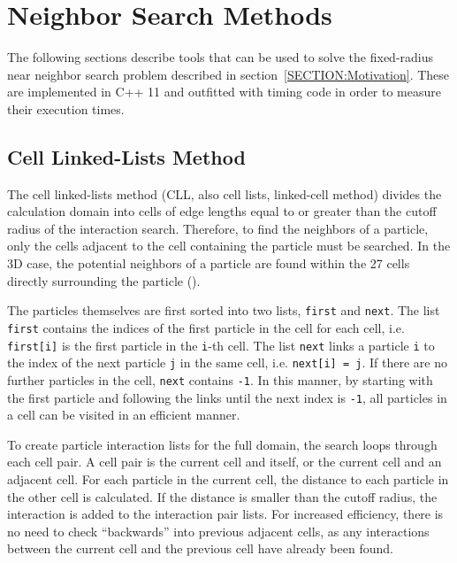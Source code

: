 \chapter{Neighbor Search Methods}

The following sections describe tools that can be used to solve the fixed-radius near neighbor search problem described in section~\ref{SECTION:Motivation}. These are implemented in C++ 11 and outfitted with timing code in order to measure their execution times. 

\section{Cell Linked-Lists Method}

The cell linked-lists method (CLL, also cell lists, linked-cell method) divides the calculation domain into cells of edge lengths equal to or greater than the cutoff radius of the interaction search. Therefore, to find the neighbors of a particle, only the cells adjacent to the cell containing the particle must be searched. In the 3D case, the potential neighbors of a particle are found within the 27 cells directly surrounding the particle (\cite{Weygand18}).

The particles themselves are first sorted into two lists, \texttt{first} and \texttt{next}. The list \texttt{first} contains the indices of the first particle in the cell for each cell, i.e. \texttt{first[i]} is the first particle in the  \texttt{i}-th cell.   The list \texttt{next} links a particle \texttt{i} to the index of the next particle \texttt{j} in the same cell, i.e. \texttt{next[i] = j}. If there are no further particles in the cell, \texttt{next} contains \texttt{-1}. In this manner, by starting with the first particle and following the links until the next index is \texttt{-1}, all particles in a cell can be visited in an efficient manner.

To create particle interaction lists for the full domain, the search loops through each cell pair. A cell pair is the current cell and itself, or the current cell and an adjacent cell. For each particle in the current cell, the distance to each particle in the other cell is calculated. If the distance is smaller than the cutoff radius, the interaction is added to the interaction pair lists. For increased efficiency, there is no need to check ``backwards'' into previous adjacent cells, as any interactions between the current cell and the previous cell have already been found.

